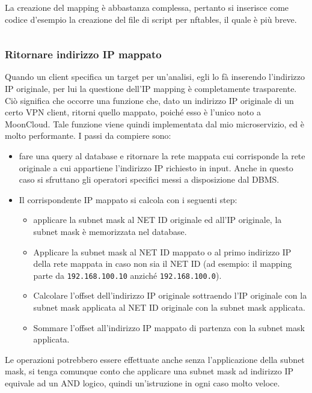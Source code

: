 La creazione del mapping è abbastanza complessa, pertanto si inserisce come codice d'esempio
la creazione del file di script per nftables, il quale è più breve.
\inputminted[tabsize=4, breaklines]{python}{code_samples/nftables.py}

\subsubsection{Ritornare indirizzo IP mappato}
Quando un client specifica un target per un'analisi, egli lo fà inserendo l'indirizzo
IP originale, per lui la questione dell'IP mapping è completamente trasparente. Ciò
significa che occorre una funzione che, dato un indirizzo IP originale di un
certo VPN client, ritorni quello mappato, poiché esso è l'unico noto a MoonCloud.
Tale funzione viene quindi implementata dal mio microservizio, ed è molto performante.
I passi da compiere sono:
\begin{itemize}
	\item fare una query al database e ritornare la rete mappata cui corrisponde
	      la rete originale a cui appartiene l'indirizzo IP richiesto in input.
	      Anche in questo caso si sfruttano gli operatori specifici messi a disposizione
	      dal DBMS.
	\item Il corrispondente IP mappato si calcola con i seguenti step:
	      \begin{itemize}
	      	\item applicare la subnet mask al NET ID originale ed all'IP originale,
	      	      la subnet mask è memorizzata nel database.
	      	\item Applicare la subnet mask al NET ID mappato o al primo indirizzo IP
	      	      della rete mappata in caso non sia il NET ID (ad esempio: il mapping
	      	      parte da \texttt{192.168.100.10} anziché \texttt{192.168.100.0}).
	      	\item Calcolare l'offset dell'indirizzo IP originale sottraendo
	      	      l'IP originale con la subnet mask applicata al NET ID originale
	      	      con la subnet mask applicata.
	      	\item Sommare l'offset all'indirizzo IP mappato di partenza con
	      	      la subnet mask applicata.
	      \end{itemize}
\end{itemize}
Le operazioni potrebbero essere effettuate anche senza l'applicazione della
subnet mask, si tenga comunque conto che applicare una subnet mask
ad indirizzo IP equivale ad un AND logico, quindi un'istruzione in ogni
caso molto veloce.


